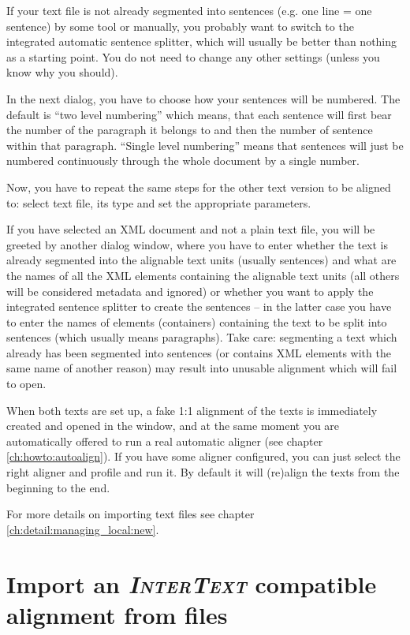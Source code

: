 \documentclass[a4paper,10pt,oneside]{book}
\newcommand{\IT}{\textit{\textsc{InterText}}\xspace}
\begin{document}
If your text file is not already segmented into sentences (e.g. one line = one sentence) by some tool or manually, you probably want to switch to the integrated automatic sentence splitter, which will usually be better than nothing as a starting point. You do not need to change any other settings (unless you know why you should).

In the next dialog, you have to choose how your sentences will be numbered. The default is ``two level numbering'' which means, that each sentence will first bear the number of the paragraph it belongs to and then the number of sentence within that paragraph. ``Single level numbering'' means that sentences will just be numbered continuously through the whole document by a single number.

Now, you have to repeat the same steps for the other text version to be aligned to: select text file, its type and set the appropriate parameters.

If you have selected an XML document and not a plain text file, you will be greeted by another dialog window, where you have to enter whether the text is already segmented into the alignable text units (usually sentences) and what are the names of all the XML elements containing the alignable text units (all others will be considered metadata and ignored) or whether you want to apply the integrated sentence splitter to create the sentences -- in the latter case you have to enter the names of elements (containers) containing the text to be split into sentences (which usually means paragraphs). Take care: segmenting a text which already has been segmented into sentences (or contains XML elements with the same name of another reason) may result into unusable alignment which will fail to open.

When both texts are set up, a fake 1:1 alignment of the texts is immediately created and opened in the window, and at the same moment you are automatically offered to run a real automatic aligner (see chapter \ref{ch:howto:autoalign}). If you have some aligner configured, you can just select the right aligner and profile and run it. By default it will (re)align the texts from the beginning to the end.

For more details on importing text files see chapter \ref{ch:detail:managing_local:new}.

\section{Import an \IT compatible alignment from files}\label{ch:howto:importfromxml}
\end{document}
